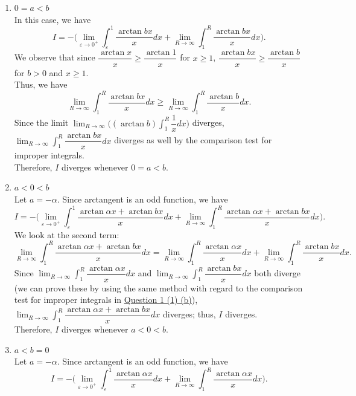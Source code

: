 \documentclass{article}
\begin{document}
\begin{enumerate}[(1)]
\begin{enumerate}
\begin{align*}
        \end{align*}
        Therefore, $I=\dfrac{\pi}{2}\ln{\dfrac{a}{b}}$ whenever $0<a<b$.
        \item $0=a<b$\label{1.(b)}\\
        In this case, we have $$\displaystyle I=-\Big(\lim_{\varepsilon\to0^+}{\int_\varepsilon^1{\dfrac{\arctan{bx}}{x}dx}}+\lim_{R\to\infty}{\int_1^R{\dfrac{\arctan{bx}}{x}dx}}\Big).$$
        We observe that since $\dfrac{\arctan{x}}{x}\geq\dfrac{\arctan{1}}{x}$ for $x\geq1$, $\dfrac{\arctan{bx}}{x}\geq\dfrac{\arctan{b}}{x}$ for $b>0$ and $x\geq1$.\\
        Thus, we have $$\displaystyle\lim_{R\to\infty}{\int_1^R{\dfrac{\arctan{bx}}{x}dx}}\geq\lim_{R\to\infty}{\int_1^R{\dfrac{\arctan{b}}{x}dx}}.$$
        Since the limit $\displaystyle\lim_{R\to\infty}{\Big((\arctan{b})\int_1^R{\dfrac{1}{x}dx}}\Big)$ diverges, $\displaystyle\lim_{R\to\infty}{\int_1^R{\dfrac{\arctan{bx}}{x}dx}}$ diverges as well by the comparison test for improper integrals.\\
        Therefore, $I$ diverges whenever $0=a<b$.
        \item $a<0<b$\\
        Let $a=-\alpha$. Since arctangent is an odd function, we have $$\displaystyle I=-\Big(\lim_{\varepsilon\to0^+}{\int_\varepsilon^1{\dfrac{\arctan{\alpha x}+\arctan{bx}}{x}dx}}+\lim_{R\to\infty}{\int_1^R{\dfrac{\arctan{\alpha x}+\arctan{bx}}{x}dx}}\Big).$$
        We look at the second term: $$\lim_{R\to\infty}{\int_1^R{\dfrac{\arctan{\alpha x}+\arctan{bx}}{x}dx}}=\lim_{R\to\infty}{\int_1^R{\dfrac{\arctan{\alpha x}}{x}dx}}+\lim_{R\to\infty}{\int_1^R{\dfrac{\arctan{bx}}{x}dx}}.$$
        Since $\displaystyle\lim_{R\to\infty}{\int_1^R{\dfrac{\arctan{\alpha x}}{x}dx}}$ and $\displaystyle\lim_{R\to\infty}{\int_1^R{\dfrac{\arctan{bx}}{x}dx}}$ both diverge (we can prove these by using the same method with regard to the comparison test for improper integrals in \hyperref[1.(b)]{Question 1 (1) (b)}), $\displaystyle\lim_{R\to\infty}{\int_1^R{\dfrac{\arctan{\alpha x}+\arctan{bx}}{x}dx}}$ diverges; thus, $I$ diverges.\\
        Therefore, $I$ diverges whenever $a<0<b$.
        \item $a<b=0$\\
        Let $a=-\alpha$. Since arctangent is an odd function, we have $$\displaystyle I=-\Big(\lim_{\varepsilon\to0^+}{\int_\varepsilon^1{\dfrac{\arctan{\alpha x}}{x}dx}}+\lim_{R\to\infty}{\int_1^R{\dfrac{\arctan{\alpha x}}{x}dx}}\Big).$$

\end{enumerate}
\end{enumerate}
\end{document}
